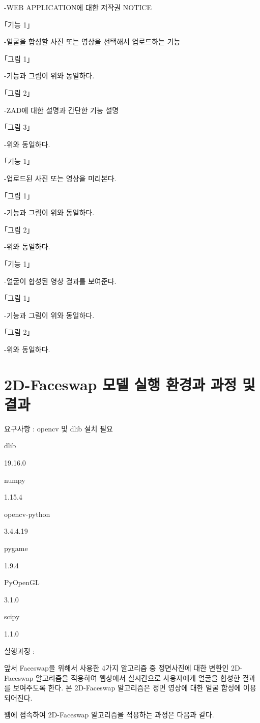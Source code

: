 \documentclass{oblivoir}
\begin{document}
-WEB APPLICATION에 대한 저작권 NOTICE

｢기능 1｣

-얼굴을 합성할 사진 또는 영상을 선택해서 업로드하는 기능

｢그림 1｣

-기능과 그림이 위와 동일하다.

｢그림 2｣

-ZAD에 대한 설명과 간단한 기능 설명

｢그림 3｣

-위와 동일하다.

｢기능 1｣

-업로드된 사진 또는 영상을 미리본다.

｢그림 1｣

-기능과 그림이 위와 동일하다.

｢그림 2｣

-위와 동일하다.

｢기능 1｣

-얼굴이 합성된 영상 결과를 보여준다.

｢그림 1｣

-기능과 그림이 위와 동일하다.

｢그림 2｣

-위와 동일하다.

\section{ 2D-Faceswap 모델 실행 환경과 과정 및 결과}

 요구사항 : opencv 및 dlib 설치 필요

 

dlib

19.16.0

numpy

1.15.4

opencv-python

3.4.4.19

pygame

1.9.4

PyOpenGL

3.1.0

scipy

1.1.0

 실행과정 : 

 앞서 Faceswap을 위해서 사용한 4가지 알고리즘 중 정면사진에 대한 변환인 2D-Faceswap 알고리즘을 적용하여 웹상에서 실시간으로 사용자에게 얼굴을 합성한 결과를 보여주도록 한다. 본 2D-Faceswap 알고리즘은 정면 영상에 대한 얼굴 합성에 이용되어진다. 

 웹에 접속하여 2D-Faceswap 알고리즘을 적용하는 과정은 다음과 같다. 
\end{document}
